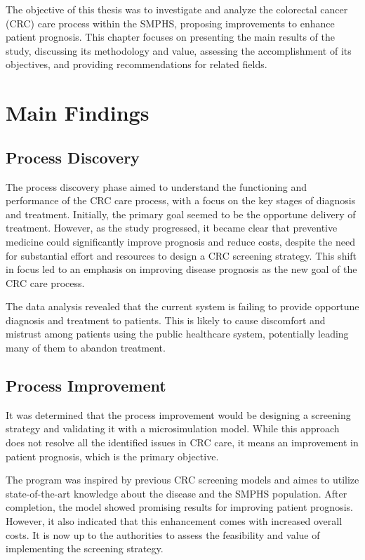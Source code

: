 The objective of this thesis was to investigate and analyze the colorectal cancer (CRC) care process within the SMPHS, proposing improvements to enhance patient prognosis. This chapter focuses on presenting the main results of the study, discussing its methodology and value, assessing the accomplishment of its objectives, and providing recommendations for related fields.

\section{Main Findings}

\subsection*{Process Discovery}
The process discovery phase aimed to understand the functioning and performance of the CRC care process, with a focus on the key stages of diagnosis and treatment. Initially, the primary goal seemed to be the opportune delivery of treatment. However, as the study progressed, it became clear that preventive medicine could significantly improve prognosis and reduce costs, despite the need for substantial effort and resources to design a CRC screening strategy. This shift in focus led to an emphasis on improving disease prognosis as the new goal of the CRC care process.

The data analysis revealed that the current system is failing to provide opportune diagnosis and treatment to patients. This is likely to cause discomfort and mistrust among patients using the public healthcare system, potentially leading many of them to abandon treatment.

\subsection*{Process Improvement}

It was determined that the process improvement would be designing a screening strategy and validating it with a microsimulation model. While this approach does not resolve all the identified issues in CRC care, it means an improvement in patient prognosis, which is the primary objective.

The program was inspired by previous CRC screening models and aimes to utilize state-of-the-art knowledge about the disease and the SMPHS population. After completion, the model showed promising results for improving patient prognosis. However, it also indicated that this enhancement comes with increased overall costs. It is now up to the authorities to assess the feasibility and value of implementing the screening strategy.

